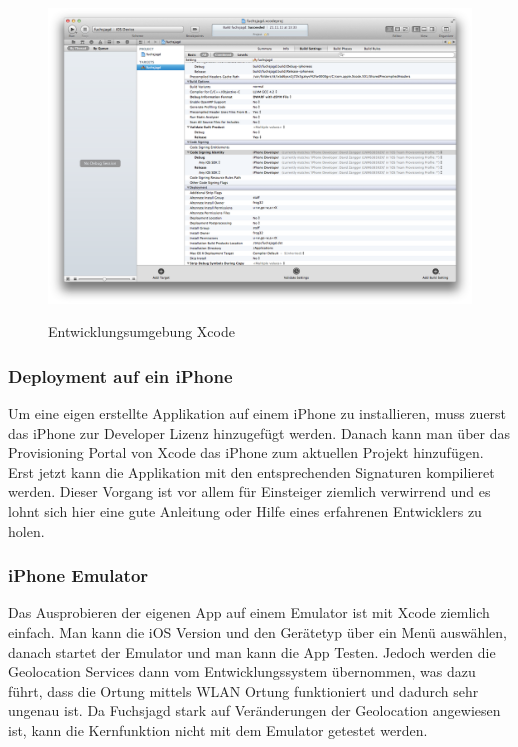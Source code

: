 \begin{figure}[H]
	\centering			      
        \includegraphics[width=14cm]{images/xcode-project.png}\\
		\caption{Entwicklungsumgebung Xcode}
	\label{fig:xcode-project}
\end{figure}

\subsubsection{Deployment auf ein iPhone} %
\label{ssub:Deployment auf ein iPhone}
Um eine eigen erstellte Applikation auf einem iPhone zu installieren, muss zuerst das iPhone zur Developer Lizenz hinzugefügt werden. Danach kann man über das Provisioning Portal von Xcode das iPhone zum aktuellen Projekt hinzufügen. Erst jetzt kann die Applikation mit den entsprechenden Signaturen kompilieret werden. Dieser Vorgang ist vor allem für Einsteiger ziemlich verwirrend und es lohnt sich hier eine gute Anleitung oder Hilfe eines erfahrenen Entwicklers zu holen.

\subsubsection{iPhone Emulator} %
\label{ssub:iPhone Emulator}
Das Ausprobieren der eigenen App auf einem Emulator ist mit Xcode ziemlich einfach. Man kann die iOS Version und den Gerätetyp über ein Menü auswählen, danach startet der Emulator und man kann die App Testen. Jedoch werden die Geolocation Services dann vom Entwicklungssystem übernommen, was dazu führt, dass die Ortung mittels WLAN Ortung funktioniert und dadurch sehr ungenau ist. Da Fuchsjagd stark auf Veränderungen der Geolocation angewiesen ist, kann die Kernfunktion nicht mit dem Emulator getestet werden.

